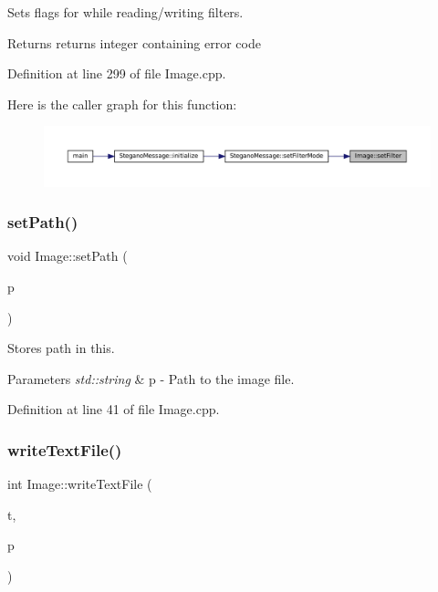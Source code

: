 Sets flags for while reading/writing filters. 

\begin{DoxyReturn}{Returns}
returns integer containing error code 
\end{DoxyReturn}


Definition at line 299 of file Image.\+cpp.

Here is the caller graph for this function\+:
\nopagebreak
\begin{figure}[H]
\begin{center}
\leavevmode
\includegraphics[width=350pt]{classImage_ac81078a3d6c364aada9afc3c8a668ef8_icgraph}
\end{center}
\end{figure}
\mbox{\label{classImage_aabb8cec47c25c0e3a36ba2a455c2aa6c}} 
\subsubsection{\texorpdfstring{setPath()}{setPath()}}
{\footnotesize\ttfamily void Image\+::set\+Path (\begin{DoxyParamCaption}\item[{std\+::string}]{p }\end{DoxyParamCaption})}



Stores path in this. 


\begin{DoxyParams}{Parameters}
{\em std\+::string} & p -\/ Path to the image file. \\
\hline
\end{DoxyParams}


Definition at line 41 of file Image.\+cpp.

\mbox{\label{classImage_a2dc30c9d6280b8c0edd2f4f0ab474a5c}} 
\subsubsection{\texorpdfstring{writeTextFile()}{writeTextFile()}}
{\footnotesize\ttfamily int Image\+::write\+Text\+File (\begin{DoxyParamCaption}\item[{std\+::string}]{t,  }\item[{std\+::string}]{p }\end{DoxyParamCaption})}



